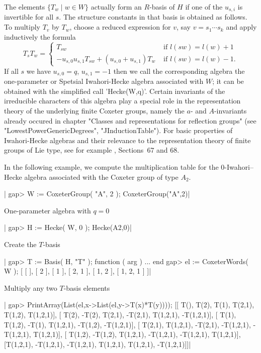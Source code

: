 The  elements $\{T_w \mid w  \in W\}$ actually form  an $R$-basis of $H$ if
one  of the $u_{s,i}$ is invertible for all $s$. The structure constants in
that  basis is obtained  as follows. To  multiply $T_v$ by  $T_w$, choose a
reduced  expression for $v$,  say $v=s_1 \cdots  s_k$ and apply inductively
the formula\:
$$
 T_sT_w = \left\{ \begin{array}{cl}
   T_{sw} & \mbox{ if  $l(sw)=l(w)+1$}\\
   -u_{s,0}u_{s,1}T_{sw}+(u_{s,0}+u_{s,1})T_w &
     \mbox{ if $l(sw)=l(w)-1$.}
  \end{array}\right.
$$
If all $s$ we have $u_{s,0}=q$, $u_{s,1}=-1$ then we call the corresponding
algebra the one-parameter or Spetsial Iwahori-Hecke algebra associated with
$W$;  it can  be obtained  with the  simplified call  'Hecke(W,q)'. Certain
invariants  of the  irreducible characters  of this  algebra play a special
role  in the representation theory of the underlying finite Coxeter groups,
namely  the $a$- and $A$-invariants already occured in chapter "Classes and
representations  for  reflection  groups" (see "LowestPowerGenericDegrees",
"JInductionTable").  For  basic  properties  of  Iwahori-Hecke algebras and
their  relevance to the representation theory of finite groups of Lie type,
see for example \cite{CR87}, Sections~67 and 68.

In the  following example, we  compute  the multiplication table for  the
$0$-Iwahori--Hecke algebra  associated  with  the Coxeter group   of type
$A_2$.

|    gap> W := CoxeterGroup( "A", 2 );
    CoxeterGroup("A",2)|

One-parameter algebra with $q=0$\:

|    gap> H := Hecke( W, 0 );
    Hecke(A2,0)|

Create the $T$-basis\:

|    gap> T := Basis( H, "T" );
    function ( arg ) ... end
    gap> el := CoxeterWords( W );
    [ [  ], [ 2 ], [ 1 ], [ 2, 1 ], [ 1, 2 ], [ 1, 2, 1 ] ]|

Multiply any two $T$-basis elements\:

|    gap> PrintArray(List(el,x->List(el,y->T(x)*T(y))));
    [[     T(),      T(2),      T(1),    T(2,1),    T(1,2),  T(1,2,1)],
     [    T(2),     -T(2),    T(2,1),   -T(2,1),  T(1,2,1), -T(1,2,1)],
     [    T(1),    T(1,2),     -T(1),  T(1,2,1),   -T(1,2), -T(1,2,1)],
     [  T(2,1),  T(1,2,1),   -T(2,1), -T(1,2,1), -T(1,2,1),  T(1,2,1)],
     [  T(1,2),   -T(1,2),  T(1,2,1), -T(1,2,1), -T(1,2,1),  T(1,2,1)],
     [T(1,2,1), -T(1,2,1), -T(1,2,1),  T(1,2,1),  T(1,2,1), -T(1,2,1)]]|

